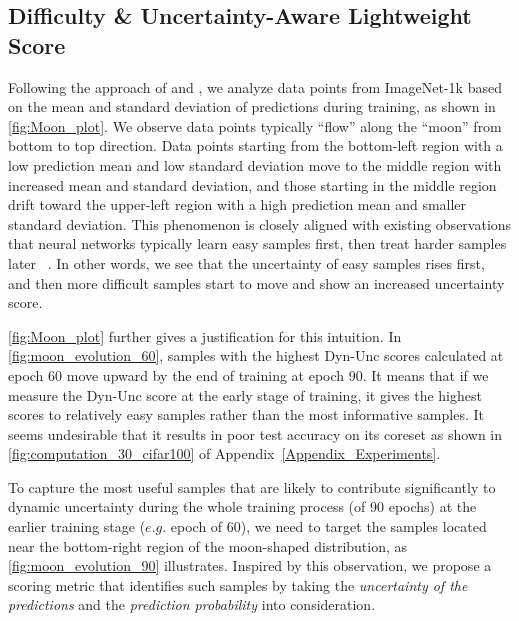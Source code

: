 \subsection{Difficulty \& Uncertainty-Aware Lightweight Score}
\label{sec:DUAL_score_compute}
Following the approach of \citet{swayamdipta2020dataset} and \citet{he2024large}, we analyze data points from ImageNet-1k based on the mean and standard deviation of predictions during training, as shown in \cref{fig:Moon_plot}. We observe data points typically ``flow'' along the ``moon'' from bottom to top direction. Data points starting from the bottom-left region with a low prediction mean and low standard deviation move to the middle region with increased mean and standard deviation, and those starting in the middle region drift toward the upper-left region with a high prediction mean and smaller standard deviation. 
This phenomenon is closely aligned with existing observations that neural networks typically learn easy samples first, then treat harder samples later ~\citep{bengio2009curriculum, arpit2017closer, jiang2020characterizing, shen2022data}. In other words, we see that the uncertainty of easy samples rises first, and then more difficult samples start to move and show an increased uncertainty score.

\cref{fig:Moon_plot} further gives a justification for this intuition. 
In \cref{fig:moon_evolution_60}, samples with the highest Dyn-Unc scores calculated at epoch 60 move upward by the end of training at epoch 90.  
It means that if we measure the Dyn-Unc score at the early stage of training, it gives the highest scores to relatively easy samples rather than the most informative samples. It seems undesirable that it results in poor test accuracy on its coreset as shown in \cref{fig:computation_30_cifar100} of Appendix~\ref{Appendix_Experiments}.

To capture the most useful samples that are likely to contribute significantly to dynamic uncertainty during the whole training process (of 90 epochs) at the earlier training stage ($e.g.$ epoch of 60), we need to target the samples located near the bottom-right region of the moon-shaped distribution, as \cref{fig:moon_evolution_90} illustrates.
Inspired by this observation, we propose a scoring metric that identifies such samples by taking the \textit{uncertainty of the predictions} and the \textit{prediction probability} into consideration.

